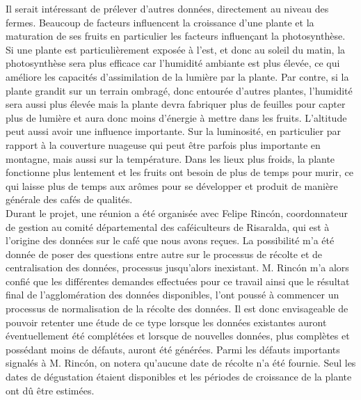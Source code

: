 



\noindent Il serait intéressant de prélever d'autres données, directement au niveau des fermes. Beaucoup de facteurs influencent la croissance d'une plante et la maturation de ses fruits en particulier les facteurs influençant la photosynthèse. Si une plante est particulièrement exposée à l'est, et donc au soleil du matin, la photosynthèse sera plus efficace car l'humidité ambiante est plus élevée, ce qui améliore les capacités d'assimilation de la lumière par la plante. Par contre, si la plante grandit sur un terrain ombragé, donc entourée d'autres plantes, l'humidité sera aussi plus élevée mais la plante devra fabriquer plus de feuilles pour capter plus de lumière et aura donc moins d'énergie à mettre dans les fruits. L'altitude peut aussi avoir une influence importante. Sur la luminosité, en particulier par rapport à la couverture nuageuse qui peut être parfois plus importante en montagne, mais aussi sur la température. Dans les lieux plus froids, la plante fonctionne plus lentement et les fruits ont besoin de plus de temps pour murir, ce qui laisse plus de temps aux arômes pour se développer et produit de manière générale des cafés de qualités.  \\






\noindent Durant le projet, une réunion a été organisée avec Felipe Rincón, coordonnateur de gestion au comité départemental des caféiculteurs de Risaralda, qui est à l'origine des données sur le café que nous avons reçues. La possibilité m'a été donnée de poser des questions entre autre sur le processus de récolte et de centralisation des données, processus jusqu'alors inexistant. M. Rincón m'a alors confié que les différentes demandes effectuées pour ce travail ainsi que le résultat final de l'agglomération des données disponibles, l'ont poussé à commencer un processus de normalisation de la récolte des données. Il est donc envisageable de pouvoir retenter une étude de ce type lorsque les données existantes auront éventuellement été complétées et lorsque de nouvelles données, plus complètes et possédant moins de défauts, auront été générées. Parmi les défauts importants signalés à M. Rincón, on notera qu'aucune date de récolte n'a été fournie. Seul les dates de dégustation étaient disponibles et les périodes de croissance de la plante ont dû être estimées. \\


